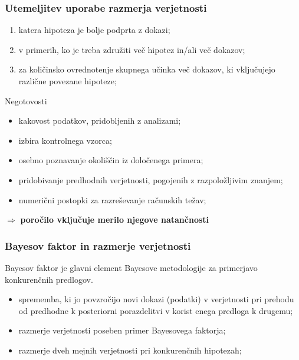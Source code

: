 \documentclass{beamer}
\begin{document}
\begin{frame}
    \frametitle{Utemeljitev uporabe razmerja verjetnosti}
    \begin{enumerate}
        \item katera hipoteza je bolje podprta z dokazi;
        \item v primerih, ko je treba združiti več hipotez in/ali več dokazov;
        \item za količinsko ovrednotenje skupnega učinka več dokazov, ki vključujejo različne povezane hipoteze;
    \end{enumerate} \vspace{3mm}
    \begin{block}{Negotovosti}
        \begin{itemize}
            \item kakovost podatkov, pridobljenih z analizami;
            \item izbira kontrolnega vzorca;
            \item osebno poznavanje okoliščin iz določenega primera;
            \item pridobivanje predhodnih verjetnosti, pogojenih z razpoložljivim znanjem;
            \item numerični postopki za razreševanje računskih težav;
        \end{itemize}
    \end{block} \vspace{2mm}
    \centering
    $\Rightarrow$ \textbf{poročilo vključuje merilo njegove natančnosti}
\end{frame}

\begin{frame}
    \frametitle{Bayesov faktor in razmerje verjetnosti}
    \begin{block}{Bayesov faktor je glavni element Bayesove metodologije za primerjavo konkurenčnih predlogov.}
        \begin{itemize}
            \item sprememba, ki jo povzročijo novi dokazi (podatki) v verjetnosti pri prehodu od predhodne k posteriorni porazdelitvi v korist enega predloga k drugemu;
            \item razmerje verjetnosti poseben primer Bayesovega faktorja;
            \item razmerje dveh mejnih verjetnosti pri konkurenčnih hipotezah;
        \end{itemize}
    \end{block}
\end{frame}
\end{document}
